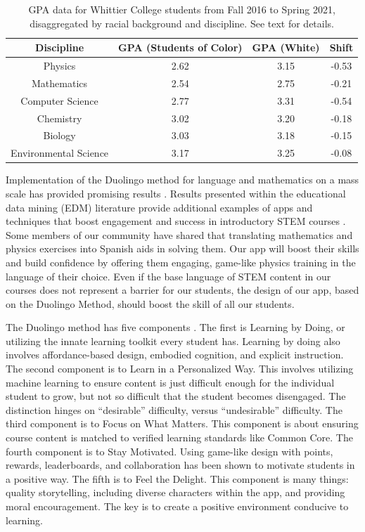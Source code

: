 \documentclass[../../main.tex]{subfiles}
\begin{document}
\begin{table}
\centering
\begin{tabular}{c c c c}
Discipline & GPA (Students of Color) & GPA (White) & Shift \\ \hline
Physics & 2.62 & 3.15 & -0.53 \\
Mathematics & 2.54 & 2.75 & -0.21 \\
Computer Science & 2.77 & 3.31 & -0.54 \\
Chemistry & 3.02 & 3.20 & -0.18 \\
Biology & 3.03 & 3.18 & -0.15 \\
Environmental Science & 3.17 & 3.25 & -0.08 \\
\end{tabular}
\caption{\label{tab:grades} GPA data for Whittier College students from Fall 2016 to Spring 2021, disaggregated by racial background and discipline.  See text for details.}
\vspace{-0.5cm}
\end{table}

Implementation of the Duolingo method for language and mathematics on a mass scale has provided promising results \cite{duolingo_whitepaper}.  Results presented within the educational data mining (EDM) literature provide additional examples of apps and techniques that boost engagement and success in introductory STEM courses \cite{edm1,edm2,edm3,edm4}.  Some members of our community have shared that translating mathematics and physics exercises into Spanish aids in solving them.  Our app will boost their skills and build confidence by offering them engaging, game-like physics training in the language of their choice.  Even if the base language of STEM content in our courses does not represent a barrier for our students, the design of our app, based on the Duolingo Method, should boost the skill of all our students. \\ \vspace{2.5mm}

The Duolingo method has five components \cite{duolingo_whitepaper}.  The first is Learning by Doing, or utilizing the innate learning toolkit every student has.  Learning by doing also involves affordance-based design, embodied cognition, and explicit instruction.  The second component is to Learn in a Personalized Way.  This involves utilizing machine learning to ensure content is just difficult enough for the individual student to grow, but not so difficult that the student becomes disengaged.  The distinction hinges on ``desirable'' difficulty, versus ``undesirable'' difficulty.  The third component is to Focus on What Matters.  This component is about ensuring course content is matched to verified learning standards like Common Core.  The fourth component is to Stay Motivated.  Using game-like design with points, rewards, leaderboards, and collaboration has been shown to motivate students in a positive way.  The fifth is to Feel the Delight. This component is many things: quality storytelling, including diverse characters within the app, and providing moral encouragement.  The key is to create a positive environment conducive to learning.  \\ \vspace{2.5mm}
\end{document}
